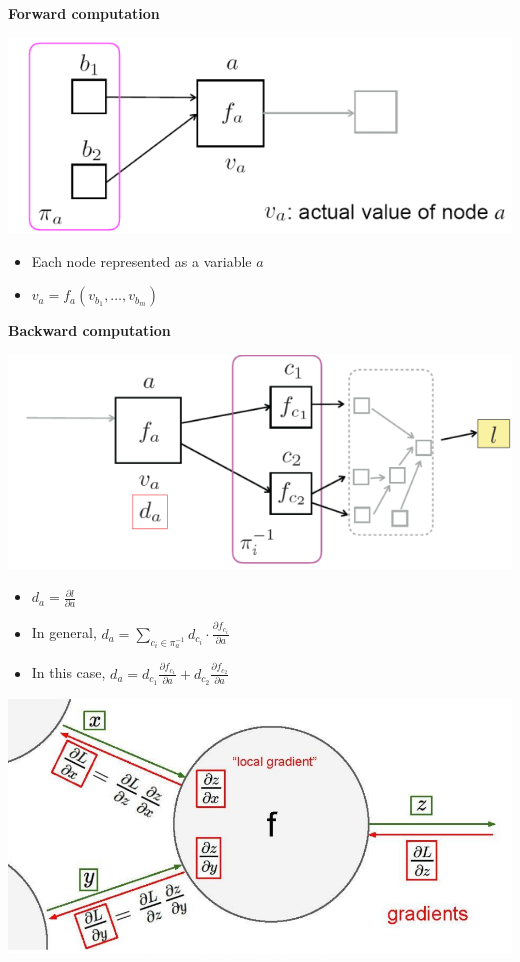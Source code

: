 \documentclass[11pt]{article}
\begin{document}
\textbf{Forward computation}
\begin{center}
\includegraphics[width=.9\textwidth]{ForwardComputation}
\end{center}
\begin{itemize}
\item Each node represented as a variable \(a\)
\item \(v_a=f_a(v_{b_1},\dots,v_{b_m})\)
\end{itemize}


\textbf{Backward computation}
\begin{center}
\includegraphics[width=.9\textwidth]{BackwardComputation}
\end{center}
\begin{itemize}
\item \(d_a=\frac{\partial l}{\partial a}\)
\item In general, \(d_a=\displaystyle\sum_{c_i\in\pi_a^{-1}}d_{c_i}\cdot
      \frac{\partial f_{c_i}}{\partial a}\)
\item In this case, \(d_a=d_{c_1}\frac{\partial f_{c_1}}{\partial a}+
      d_{c_2}\frac{\partial f_{c_2}}{\partial a}\)
\end{itemize}


\begin{center}
\includegraphics[width=.5\textwidth]{Backpro}
\end{center}
\end{document}
